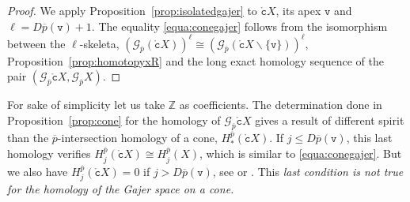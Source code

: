 \documentclass[a4paper,10pt,english,reqno]{amsart}
\theoremstyle{plain}
\theoremstyle{definition}
\theoremstyle{remark}
\numberwithin{equation}{section}
\newcommand{\propref}[1]{Proposition~\ref{#1}}
\def\ov{\overline}
\def\crG{{\mathscr G}}
\def\tc{{\mathtt c}}
\def\tv{{\mathtt v}}
\def\Z{\mathbb{Z}}
\def\rc{{\mathring{\tc}}}
\def\menos{\backslash}
\renewcommand\1{\hbox{\ding{192}}}
\renewcommand\2{\hbox{\ding{193}}}
\newcommand\3{\hbox{\ding{194}}}
\newcommand\4{\hbox{\ding{195}}}
\begin{document}
\begin{proof}
We apply \propref{prop:isolatedgajer} to $\rc X$,  its apex $\tv$ and $\ell=D\ov{p}(\tv)+1$. 
The equality \eqref{equa:conegajer} follows from the isomorphism between
the $\ell$-skeleta, $(\crG_{\ov{p}}(\rc X))^\ell\cong (\crG_{\ov{p}}(\rc X\menos\{\tv\}))^\ell$, 
\propref{prop:homotopyxR} and the long exact 
homology sequence of the pair $(\crG_{\ov{p}}\rc X,\crG_{\ov{p}}X)$.
%
\end{proof}

%
For sake of simplicity let us take $\Z$ as coefficients. 
%
%
The determination done in \propref{prop:cone} for the homology of $\crG_{\ov{p}}\rc X$ gives a result of different spirit than the $\ov{p}$-intersection homology of a cone, $H_{*}^{\ov{p}}(\rc X)$.  
 If  $j\leq D\ov{p}(\tv)$, this last homology verifies $H_{j}^{\ov{p}}(\rc X) \cong
H^{\ov{p}}_{j}(X)$,
which is similar to \eqref{equa:conegajer}.
But we also have $H^{\ov{p}}_{j}(\rc X)=0$ if  $j> D\ov{p}(\tv)$, see \cite[Proposition 3]{CST8} or \cite[Proposition 5.2]{CST3}.
This \emph{last condition is not true for the homology of the Gajer space on a cone.}
\end{document}
